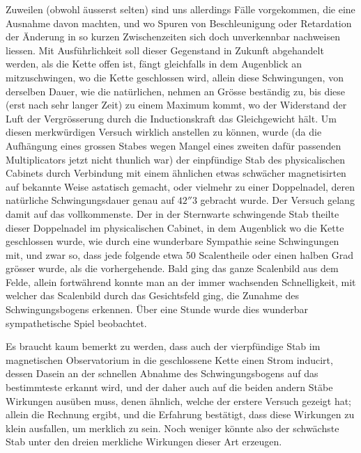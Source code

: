 \expandafter\def\csname HistoricalNoteText550\endcsname{Zuweilen (obwohl äusserst selten) sind uns allerdings Fälle vorgekommen, die eine Ausnahme davon machten, und wo Spuren von Beschleunigung oder Retardation der Änderung in so kurzen Zwischenzeiten sich doch unverkennbar nachweisen liessen. Mit Ausführlichkeit soll dieser Gegenstand in Zukunft abgehandelt werden,}
als die Kette offen ist, fängt gleichfalls in dem Augenblick an mitzuschwingen, wo die Kette geschlossen wird, allein diese Schwingungen, von derselben Dauer, wie die natürlichen, nehmen an Grösse beständig zu, bis diese (erst nach sehr langer Zeit) zu einem Maximum kommt, wo der Widerstand der Luft der Vergrösserung durch die Inductionskraft das Gleichgewicht hält. Um diesen merkwürdigen Versuch wirklich anstellen zu können, wurde (da die Aufhängung eines grossen Stabes wegen Mangel eines zweiten dafür passenden Multiplicators jetzt nicht thunlich war) der einpfündige Stab des physicalischen Cabinets durch Verbindung mit einem ähnlichen etwas schwächer magnetisirten auf bekannte Weise astatisch gemacht, oder vielmehr zu einer Doppelnadel, deren natürliche Schwingungsdauer genau auf $42''3$ gebracht wurde. Der Versuch gelang damit auf das vollkommenste. Der in der Sternwarte schwingende Stab theilte dieser Doppelnadel im physicalischen Cabinet, in dem Augenblick wo die Kette geschlossen wurde, wie durch eine wunderbare Sympathie seine Schwingungen mit, und zwar so, dass jede folgende etwa 50 Scalentheile oder einen halben Grad grösser wurde, als die vorhergehende. Bald ging das ganze Scalenbild aus dem Felde, allein fortwährend konnte man an der immer wachsenden Schnelligkeit, mit welcher das Scalenbild durch das Gesichtsfeld ging, die Zunahme des Schwingungsbogens erkennen. Über eine Stunde wurde dies wunderbar sympathetische Spiel beobachtet.

Es braucht kaum bemerkt zu werden, dass auch der vierpfündige Stab im magnetischen Observatorium in die geschlossene Kette einen Strom inducirt, dessen Dasein an der schnellen Abnahme des Schwingungsbogens auf das bestimmteste erkannt wird, und der daher auch auf die beiden andern Stäbe Wirkungen ausüben muss, denen ähnlich, welche der erstere Versuch gezeigt hat; allein die Rechnung ergibt, und die Erfahrung bestätigt, dass diese Wirkungen zu klein ausfallen, um merklich zu sein. Noch weniger könnte also der schwächste Stab unter den dreien merkliche Wirkungen dieser Art erzeugen.

